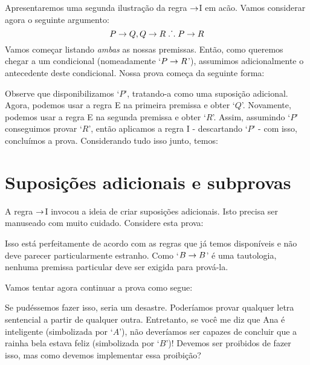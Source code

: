 Apresentaremos uma segunda ilustra\c c\~ao da regra $\rightarrow$I em ac\~ao. Vamos considerar  agora o seguinte argumento:
	$$P \rightarrow Q, Q \rightarrow R \mathrel{\ldotp\dot{}\,\ldotp} P \rightarrow R$$
Vamos come\c car listando \emph{ambas} as nossas premissas. Ent\~ao, como queremos chegar a um condicional (nomeadamente `$P \rightarrow R$'),  assumimos adicionalmente o antecedente deste condicional.
Nossa prova começa da seguinte forma:

\begin{fitchproof}
	\open
	\close
\end{fitchproof}
Observe que disponibilizamos `$P$',  tratando-a como uma suposi\c c\~ao adicional.  
Agora, podemos usar a regra  {\eif}E na primeira premissa e obter `$Q$'. Novamente, podemos usar  a regra {\eif}E na segunda premissa e obter `$R$'. Assim, assumindo `$P$'  conseguimos provar `$R$',   ent\~ao aplicamos a regra {\eif}I  - descartando `$P$' - com isso, conclu\'imos a prova.  Considerando tudo isso junto, temos: 


\label{HSproof}
\begin{fitchproof}
	\open
	\close
\end{fitchproof}


\section{Suposi\c c\~oes adicionais  e subprovas}
A regra $\rightarrow$I invocou a ideia de criar  suposi\c c\~oes adicionais.   Isto precisa ser manuseado com muito cuidado. Considere esta prova:
\begin{fitchproof}
	\open
		 
	\close
\end{fitchproof}
Isso est\'a perfeitamente de acordo com as regras  que j\'a temos dispon\'iveis e n\~ao deve parecer particularmente estranho.   Como `$B \rightarrow B$'  \'e uma tautologia, nenhuma premissa particular deve ser exigida para prov\'a-la.

Vamos tentar agora continuar a prova como segue: 


\begin{fitchproof}
	\open
		 
	\close
	 
	 
\end{fitchproof}
Se pud\'essemos fazer isso, seria um desastre. Poder\'iamos provar qualquer  letra sentencial a partir de qualquer outra. Entretanto, se  voc\^e me diz que Ana \'e inteligente  (simbolizada por `$A$'),  n\~ao dever\'iamos ser capazes de concluir que a rainha bela estava feliz (simbolizada por `$B$')!   Devemos ser proibidos de fazer isso, mas como devemos implementar essa proibi\c c\~ao?

